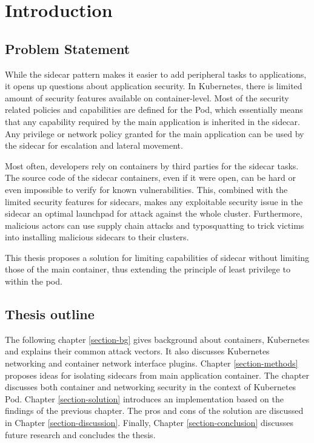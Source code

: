 \documentclass[english,12pt,a4paper,pdftex,sci,utf8]{aaltothesis}
\begin{document}
\thispagestyle{empty}

\section{Introduction}


\subsection{Problem Statement}

While the sidecar pattern makes it easier to add peripheral tasks to applications, it opens up questions about application security. In Kubernetes, there is limited amount of security features available on container-level. Most of the security related policies and capabilities are defined for the Pod, which essentially means that any capability required by the main application is inherited in the sidecar. Any privilege or network policy granted for the main application can be used by the sidecar for escalation and lateral movement.

Most often, developers rely on containers by third parties for the sidecar tasks. The source code of the sidecar containers, even if it were open, can be hard or even impossible to verify for known vulnerabilities. This, combined with the limited security features for sidecars, makes any exploitable security issue in the sidecar an optimal launchpad for attack against the whole cluster. Furthermore, malicious actors can use supply chain attacks and typosquatting to trick victims into installing malicious sidecars to their clusters.

This thesis proposes a solution for limiting capabilities of sidecar without limiting those of the main container, thus extending the principle of least privilege to within the pod.

\subsection{Thesis outline}

The following chapter \ref{section-bg} gives background about containers, Kubernetes and explains their common attack vectors. It also discusses Kubernetes networking and container network interface plugins. Chapter \ref{section-methods} proposes ideas for isolating sidecars from main application container. The chapter discusses both container and networking security in the context of Kubernetes Pod. Chapter \ref{section-solution} introduces an implementation based on the findings of the previous chapter. The pros and cons of the solution are discussed in Chapter \ref{section-discussion}. Finally, Chapter \ref{section-conclusion} discusses future research and concludes the thesis.
\end{document}
